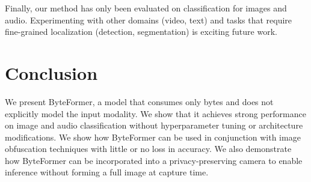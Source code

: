 Finally, our method has only been evaluated on classification for images and audio. Experimenting with other domains (video, text) and tasks that require fine-grained localization (detection, segmentation) is exciting future work.

\section{Conclusion}
We present ByteFormer, a model that consumes only bytes and does not explicitly model the input modality. We show that it achieves strong performance on image and audio classification without hyperparameter tuning or architecture modifications. We show how ByteFormer can be used in conjunction with image obfuscation techniques with little or no loss in accuracy. We also demonstrate how ByteFormer can be incorporated into a privacy-preserving camera to enable inference without forming a full image at capture time.